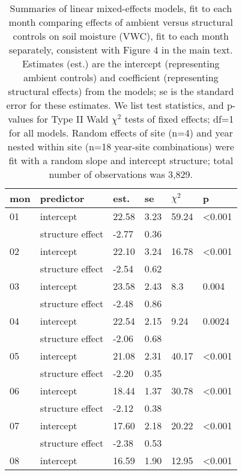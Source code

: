 \documentclass{article}
\begin{document}
\begin{table}[ht]
\centering
\caption{Summaries of linear mixed-effects models, fit to each month comparing effects of ambient versus structural controls on soil moisture (VWC), fit to each month separately, consistent with Figure 4 in the main text. Estimates (est.) are the intercept (representing ambient controls) and coefficient (representing structural effects) from the models; se is the standard error for these estimates. We list test statistics, and p-values for Type II Wald $\chi^{2}$ tests of fixed effects; df=1 for all models. Random effects of site (n=4) and year nested within site (n=18 year-site combinations) were fit with a random slope and intercept structure; total number of observations was 3,829.} 
\label{table:shamamb_soilmoism}
\begingroup\footnotesize
\begin{tabular}{|p{}|p{}|p{}p{}p{}p{}|}
  \hline
mon & predictor & est. & se & $\chi^2$ & p \\ 
  \hline
01 & intercept & 22.58 & 3.23 & 59.24 & <0.001 \\ 
    & structure effect & -2.77 & 0.36 &  &  \\ 
   \hline
02 & intercept & 22.10 & 3.24 & 16.78 & <0.001 \\ 
    & structure effect & -2.54 & 0.62 &  &  \\ 
   \hline
03 & intercept & 23.58 & 2.43 & 8.3 & 0.004 \\ 
    & structure effect & -2.48 & 0.86 &  &  \\ 
   \hline
04 & intercept & 22.54 & 2.15 & 9.24 & 0.0024 \\ 
    & structure effect & -2.06 & 0.68 &  &  \\ 
   \hline
05 & intercept & 21.08 & 2.31 & 40.17 & <0.001 \\ 
    & structure effect & -2.20 & 0.35 &  &  \\ 
   \hline
06 & intercept & 18.44 & 1.37 & 30.78 & <0.001 \\ 
    & structure effect & -2.12 & 0.38 &  &  \\ 
   \hline
07 & intercept & 17.60 & 2.18 & 20.22 & <0.001 \\ 
    & structure effect & -2.38 & 0.53 &  &  \\ 
   \hline
08 & intercept & 16.59 & 1.90 & 12.95 & <0.001 \\ 

\end{tabular}
\end{table}
\end{document}
